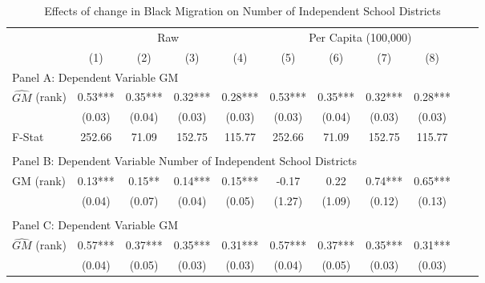  \begin{table}[htbp]\centering {} \begin{threeparttable} \caption{Effects of change in Black Migration on Number of Independent School Districts} \begin{tabular}{l*{10}{c}} \toprule
                &\multicolumn{4}{c}{Raw}                                    &\multicolumn{4}{c}{Per Capita (100,000)}                   \\\cmidrule(lr){2-5}\cmidrule(lr){6-9}
                &\multicolumn{1}{c}{(1)}   &\multicolumn{1}{c}{(2)}   &\multicolumn{1}{c}{(3)}   &\multicolumn{1}{c}{(4)}   &\multicolumn{1}{c}{(5)}   &\multicolumn{1}{c}{(6)}   &\multicolumn{1}{c}{(7)}   &\multicolumn{1}{c}{(8)}   \\
\cmidrule(lr){1-9}
\multicolumn{8}{l}{Panel A: Dependent Variable GM}\\
\cmidrule(lr){1-9}
$\hat{GM}$ (rank)&       0.53***&       0.35***&       0.32***&       0.28***&       0.53***&       0.35***&       0.32***&       0.28***\\
                &     (0.03)   &     (0.04)   &     (0.03)   &     (0.03)   &     (0.03)   &     (0.04)   &     (0.03)   &     (0.03)   \\
\midrule
F-Stat          &     252.66   &      71.09   &     152.75   &     115.77   &     252.66   &      71.09   &     152.75   &     115.77   \\
\cmidrule[\heavyrulewidth](lr){1-9} \\ \cmidrule[\heavyrulewidth](lr){1-9}
\multicolumn{8}{l}{Panel B: Dependent Variable Number of Independent School Districts}\\
\cmidrule(lr){1-9}
GM  (rank)      &       0.13***&       0.15** &       0.14***&       0.15***&      -0.17   &       0.22   &       0.74***&       0.65***\\
                &     (0.04)   &     (0.07)   &     (0.04)   &     (0.05)   &     (1.27)   &     (1.09)   &     (0.12)   &     (0.13)   \\
\cmidrule[\heavyrulewidth](lr){1-9} \\ \cmidrule[\heavyrulewidth](lr){1-9}
\multicolumn{8}{l}{Panel C: Dependent Variable GM}\\
\cmidrule(lr){1-9}
$\hat{GM}$ (rank)&       0.57***&       0.37***&       0.35***&       0.31***&       0.57***&       0.37***&       0.35***&       0.31***\\
                &     (0.04)   &     (0.05)   &     (0.03)   &     (0.03)   &     (0.04)   &     (0.05)   &     (0.03)   &     (0.03)   \\

\end{tabular}
\end{threeparttable}
\end{table}
